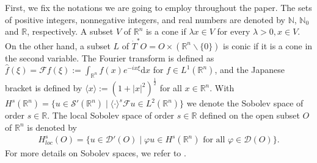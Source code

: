\documentclass{amsart}
\theoremstyle{definition}
\begin{document}
First, we fix the notations we are going to employ throughout the paper. The sets of positive integers, nonnegative integers, and real numbers are denoted by $\mathbb{N}$, $\mathbb{N}_0$ and $\mathbb{R}$, respectively. A subset $V$ of $\mathbb{R}^n$ is a cone if $\lambda x\in V$ for every $\lambda>0,x\in V$. On the other hand, a subset $L$ of $\dot{T}^*O = O\times (\mathbb{R}^n\backslash\{0\})$ is conic if it is a cone in the second variable. The Fourier transform is defined as $\widehat{f} (\xi)=\mathcal{F}f(\xi) := \int_{\mathbb{R}^n} f(x) e^{-ix\xi} \mathrm{d}x$ for $f\in L^1 (\mathbb{R}^n)$, and the Japanese bracket is defined by $\langle x \rangle := (1+|x|^2)^{\frac{1}{2}}$ for all $x\in \mathbb{R}^n$. With $H^s (\mathbb{R}^n) = \{ u\in\mathcal{S}'(\mathbb{R}^n) \mid \langle \cdot \rangle^s \mathcal{F}u \in L^2 (\mathbb{R}^n) \}$ we denote the Sobolev space of order $s\in\mathbb{R}$. The local Sobolev space of order $s\in\mathbb{R}$ defined on the open subset $O$ of $\mathbb{R}^n$ is denoted by
\begin{align}
\label{Lokalni_Soboljev}
H_{loc} ^s (O) = \{ u\in\mathcal{D}' (O) \mid \varphi u \in H^{s} (\mathbb{R}^n) \text{ for all } \varphi\in\mathcal{D} (O) \}.
\end{align}
For more details on Sobolev spaces, we refer to \cite{Adams}.
\end{document}
